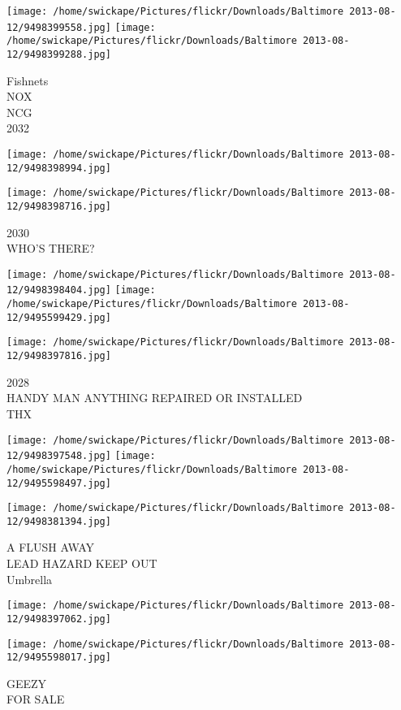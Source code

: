 \documentclass[10pt,letterpaper]{article}
\begin{document}
\texttt{[image: /home/swickape/Pictures/flickr/Downloads/Baltimore 2013-08-12/9498399558.jpg]}
\texttt{[image: /home/swickape/Pictures/flickr/Downloads/Baltimore 2013-08-12/9498399288.jpg]}

Fishnets\\
NOX\\
NCG\\
2032
\pagebreak

\texttt{[image: /home/swickape/Pictures/flickr/Downloads/Baltimore 2013-08-12/9498398994.jpg]}

\vspace{0.25in}
\texttt{[image: /home/swickape/Pictures/flickr/Downloads/Baltimore 2013-08-12/9498398716.jpg]}

2030\\
WHO'S THERE?
\pagebreak

\texttt{[image: /home/swickape/Pictures/flickr/Downloads/Baltimore 2013-08-12/9498398404.jpg]}
\texttt{[image: /home/swickape/Pictures/flickr/Downloads/Baltimore 2013-08-12/9495599429.jpg]}

\vspace{0.25in}
\texttt{[image: /home/swickape/Pictures/flickr/Downloads/Baltimore 2013-08-12/9498397816.jpg]}

2028\\
HANDY MAN ANYTHING REPAIRED OR INSTALLED\\
THX
\pagebreak

\texttt{[image: /home/swickape/Pictures/flickr/Downloads/Baltimore 2013-08-12/9498397548.jpg]}
\texttt{[image: /home/swickape/Pictures/flickr/Downloads/Baltimore 2013-08-12/9495598497.jpg]}

\texttt{[image: /home/swickape/Pictures/flickr/Downloads/Baltimore 2013-08-12/9498381394.jpg]}

A FLUSH AWAY\\
LEAD HAZARD KEEP OUT\\
Umbrella
\pagebreak

\texttt{[image: /home/swickape/Pictures/flickr/Downloads/Baltimore 2013-08-12/9498397062.jpg]}

\vspace{0.25in}
\texttt{[image: /home/swickape/Pictures/flickr/Downloads/Baltimore 2013-08-12/9495598017.jpg]}

GEEZY\\
FOR SALE
\pagebreak
\end{document}
